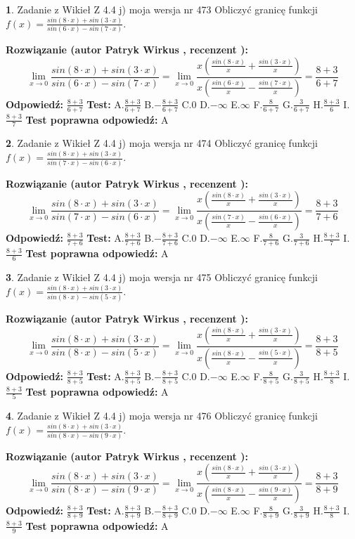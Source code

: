 \documentclass[12pt, a4paper]{article}
\theoremstyle{definition} %
\newtheorem{zad}{}
\newcommand{\zadStart}[1]{\begin{zad}#1\newline}
\newcommand{\zadStop}{\end{zad}}
\newcommand{\rozwStart}[2]{\noindent \textbf{Rozwiązanie (autor #1 , recenzent #2): }\newline}
\newcommand{\rozwStop}{\newline}
\newcommand{\odpStart}{\noindent \textbf{Odpowiedź:}\newline}
\newcommand{\odpStop}{\newline}
\newcommand{\testStart}{\noindent \textbf{Test:}\newline}
\newcommand{\testStop}{\newline}
\newcommand{\kluczStart}{\noindent \textbf{Test poprawna odpowiedź:}\newline}
\newcommand{\kluczStop}{\newline}
\begin{document}
\zadStart{Zadanie z Wikieł Z 4.4 j) moja wersja nr 473}
Obliczyć granicę funkcji $f(x)=\frac{sin(8\cdot x) +sin(3\cdot x)}{sin(6\cdot x) -sin(7\cdot x)}$.
\zadStop
\rozwStart{Patryk Wirkus}{}
$$\lim\limits_{x\to 0}\frac{sin(8\cdot x) +sin(3\cdot x)}{sin(6\cdot x) -sin(7\cdot x)}=\lim\limits_{x\to 0}\frac{x(\frac{sin(8\cdot x)}{x}+\frac{sin(3\cdot x)}{x})}{x(\frac{sin(6\cdot x)}{x}-\frac{sin(7\cdot x)}{x})}=\frac{8+3}{6+7}$$
\rozwStop
\odpStart
$\frac{8+3}{6+7}$
\odpStop
\testStart
A.$\frac{8+3}{6+7}$
B.$-\frac{8+3}{6+7}$
C.$0$
D.$-\infty$
E.$\infty$
F.$\frac{8}{6+7}$
G.$\frac{3}{6+7}$
H.$\frac{8+3}{6}$
I.$\frac{8+3}{7}$
\testStop
\kluczStart
A
\kluczStop



\zadStart{Zadanie z Wikieł Z 4.4 j) moja wersja nr 474}
Obliczyć granicę funkcji $f(x)=\frac{sin(8\cdot x) +sin(3\cdot x)}{sin(7\cdot x) -sin(6\cdot x)}$.
\zadStop
\rozwStart{Patryk Wirkus}{}
$$\lim\limits_{x\to 0}\frac{sin(8\cdot x) +sin(3\cdot x)}{sin(7\cdot x) -sin(6\cdot x)}=\lim\limits_{x\to 0}\frac{x(\frac{sin(8\cdot x)}{x}+\frac{sin(3\cdot x)}{x})}{x(\frac{sin(7\cdot x)}{x}-\frac{sin(6\cdot x)}{x})}=\frac{8+3}{7+6}$$
\rozwStop
\odpStart
$\frac{8+3}{7+6}$
\odpStop
\testStart
A.$\frac{8+3}{7+6}$
B.$-\frac{8+3}{7+6}$
C.$0$
D.$-\infty$
E.$\infty$
F.$\frac{8}{7+6}$
G.$\frac{3}{7+6}$
H.$\frac{8+3}{7}$
I.$\frac{8+3}{6}$
\testStop
\kluczStart
A
\kluczStop



\zadStart{Zadanie z Wikieł Z 4.4 j) moja wersja nr 475}
Obliczyć granicę funkcji $f(x)=\frac{sin(8\cdot x) +sin(3\cdot x)}{sin(8\cdot x) -sin(5\cdot x)}$.
\zadStop
\rozwStart{Patryk Wirkus}{}
$$\lim\limits_{x\to 0}\frac{sin(8\cdot x) +sin(3\cdot x)}{sin(8\cdot x) -sin(5\cdot x)}=\lim\limits_{x\to 0}\frac{x(\frac{sin(8\cdot x)}{x}+\frac{sin(3\cdot x)}{x})}{x(\frac{sin(8\cdot x)}{x}-\frac{sin(5\cdot x)}{x})}=\frac{8+3}{8+5}$$
\rozwStop
\odpStart
$\frac{8+3}{8+5}$
\odpStop
\testStart
A.$\frac{8+3}{8+5}$
B.$-\frac{8+3}{8+5}$
C.$0$
D.$-\infty$
E.$\infty$
F.$\frac{8}{8+5}$
G.$\frac{3}{8+5}$
H.$\frac{8+3}{8}$
I.$\frac{8+3}{5}$
\testStop
\kluczStart
A
\kluczStop



\zadStart{Zadanie z Wikieł Z 4.4 j) moja wersja nr 476}
Obliczyć granicę funkcji $f(x)=\frac{sin(8\cdot x) +sin(3\cdot x)}{sin(8\cdot x) -sin(9\cdot x)}$.
\zadStop
\rozwStart{Patryk Wirkus}{}
$$\lim\limits_{x\to 0}\frac{sin(8\cdot x) +sin(3\cdot x)}{sin(8\cdot x) -sin(9\cdot x)}=\lim\limits_{x\to 0}\frac{x(\frac{sin(8\cdot x)}{x}+\frac{sin(3\cdot x)}{x})}{x(\frac{sin(8\cdot x)}{x}-\frac{sin(9\cdot x)}{x})}=\frac{8+3}{8+9}$$
\rozwStop
\odpStart
$\frac{8+3}{8+9}$
\odpStop
\testStart
A.$\frac{8+3}{8+9}$
B.$-\frac{8+3}{8+9}$
C.$0$
D.$-\infty$
E.$\infty$
F.$\frac{8}{8+9}$
G.$\frac{3}{8+9}$
H.$\frac{8+3}{8}$
I.$\frac{8+3}{9}$
\testStop
\kluczStart
A
\kluczStop
\end{document}
